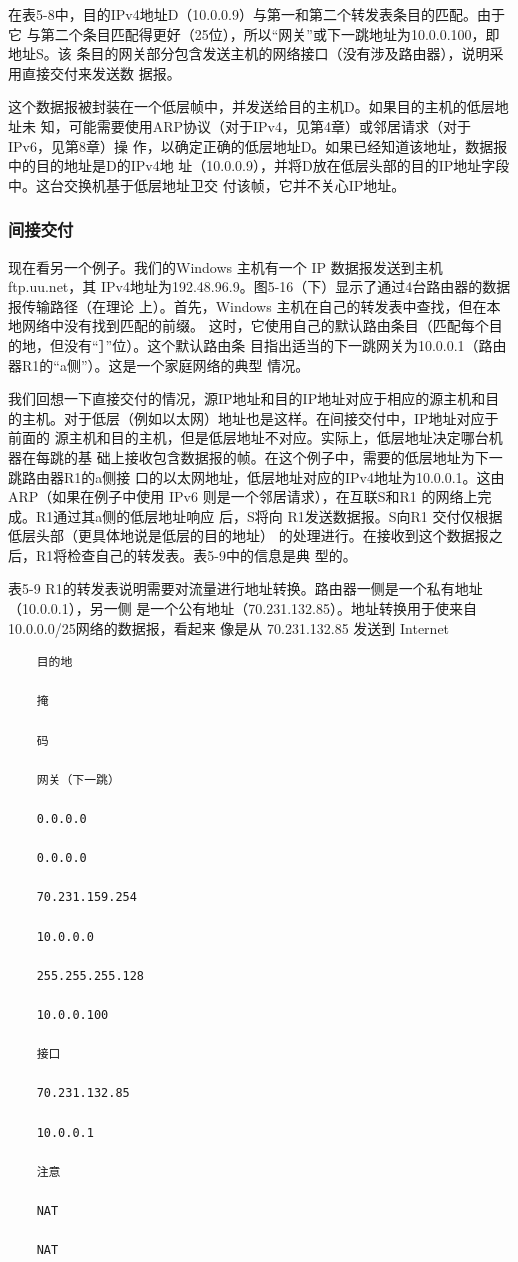 在表5-8中，目的IPv4地址D（10.0.0.9）与第一和第二个转发表条目的匹配。由于它
与第二个条目匹配得更好（25位），所以“网关”或下一跳地址为10.0.0.100，即地址S。该
条目的网关部分包含发送主机的网络接口（没有涉及路由器），说明采用直接交付来发送数
据报。

这个数据报被封装在一个低层帧中，并发送给目的主机D。如果目的主机的低层地址未
知，可能需要使用ARP协议（对于IPv4，见第4章）或邻居请求（对于 IPv6，见第8章）操
作，以确定正确的低层地址D。如果已经知道该地址，数据报中的目的地址是D的IPv4地
址（10.0.0.9），并将D放在低层头部的目的IP地址字段中。这台交换机基于低层地址卫交
付该帧，它并不关心IP地址。

\subsubsection{间接交付}
现在看另一个例子。我们的Windows 主机有一个 IP 数据报发送到主机 ftp.uu.net，其
IPv4地址为192.48.96.9。图5-16（下）显示了通过4台路由器的数据报传输路径（在理论
上）。首先，Windows 主机在自己的转发表中查找，但在本地网络中没有找到匹配的前缀。
这时，它使用自己的默认路由条目（匹配每个目的地，但没有“］”位）。这个默认路由条
目指出适当的下一跳网关为10.0.0.1（路由器R1的“a侧”）。这是一个家庭网络的典型
情况。

我们回想一下直接交付的情况，源IP地址和目的IP地址对应于相应的源主机和目
的主机。对于低层（例如以太网）地址也是这样。在间接交付中，IP地址对应于前面的
源主机和目的主机，但是低层地址不对应。实际上，低层地址决定哪台机器在每跳的基
础上接收包含数据报的帧。在这个例子中，需要的低层地址为下一跳路由器R1的a侧接
口的以太网地址，低层地址对应的IPv4地址为10.0.0.1。这由 ARP（如果在例子中使用
IPv6 则是一个邻居请求），在互联S和R1 的网络上完成。R1通过其a侧的低层地址响应
后，S将向 R1发送数据报。S向R1 交付仅根据低层头部（更具体地说是低层的目的地址）
的处理进行。在接收到这个数据报之后，R1将检查自己的转发表。表5-9中的信息是典
型的。

表5-9 R1的转发表说明需要对流量进行地址转换。路由器一侧是一个私有地址（10.0.0.1），另一侧
是一个公有地址（70.231.132.85）。地址转换用于使来自10.0.0.0/25网络的数据报，看起来
像是从 70.231.132.85 发送到 Internet

\begin{verbatim}
    目的地
    
    掩
    
    码
    
    网关（下一跳）
    
    0.0.0.0
    
    0.0.0.0
    
    70.231.159.254
    
    10.0.0.0
    
    255.255.255.128
    
    10.0.0.100
    
    接口
    
    70.231.132.85
    
    10.0.0.1
    
    注意
    
    NAT
    
    NAT
\end{verbatim}

